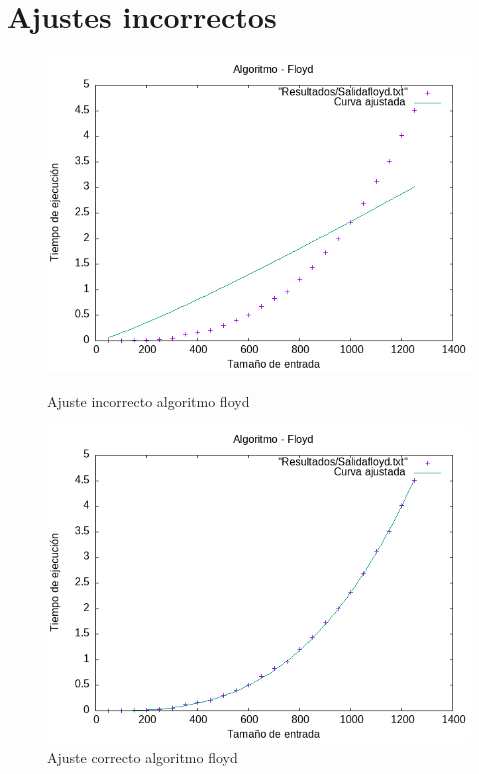 \documentclass[11pt,openany]{book}
\begin{document}
\section{Ajustes incorrectos}
\begin{figure}[H]
    \begin{minipage}{0.5\textwidth}
        \centering
        \includegraphics[width=\linewidth]{assets/AjusteIncorrecto/Floyd_hib.png}
        \caption{Ajuste incorrecto algoritmo floyd}
        \label{fig:floyd}
    \end{minipage}%
    \begin{minipage}{0.5\textwidth}
        \centering
        \includegraphics[width=\linewidth]{assets/AjusteHibrido_latex/Hibrido_fibonacci_floyd_hanoi/Floyd_hib.png}
        \caption{Ajuste correcto algoritmo floyd}
        \label{fig:floyd}
    \end{minipage}
\end{figure}
\end{document}
